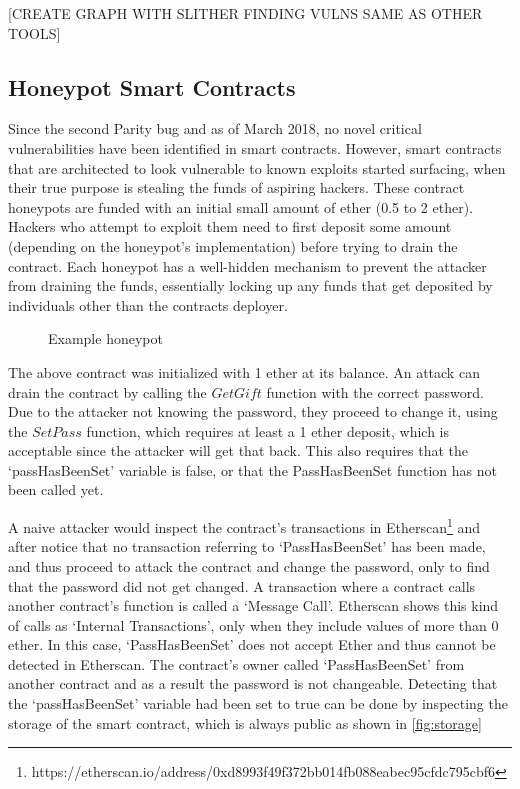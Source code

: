 [CREATE GRAPH WITH SLITHER FINDING VULNS SAME AS OTHER TOOLS]

\subsection{Honeypot Smart Contracts}
Since the second Parity bug and as of March 2018, no novel critical vulnerabilities have been identified in smart contracts. However, smart contracts that are architected to look vulnerable to known exploits started surfacing, when their true purpose is stealing the funds of aspiring hackers. These contract honeypots are funded with an initial small amount of ether (0.5 to 2 ether). Hackers who attempt to exploit them need to first deposit some amount (depending on the honeypot's implementation) before trying to drain the contract. Each honeypot has a well-hidden mechanism to prevent the attacker from draining the funds, essentially locking up any funds that get deposited by individuals other than the contracts deployer. 

\begin{figure}[H]
    \centering
    
    \caption{Example honeypot}
    \label{smart_contract}
\end{figure}

The above contract was initialized with 1 ether at its balance. An attack can drain the contract by calling the $GetGift$ function with the correct password. Due to the attacker not knowing the password, they proceed to change it, using the $SetPass$ function, which requires at least a 1 ether deposit, which is acceptable since the attacker will get that back. This also requires that the `passHasBeenSet' variable is false, or that the PassHasBeenSet function has not been called yet.

A naive attacker would inspect the contract's transactions in Etherscan\footnote{https://etherscan.io/address/0xd8993f49f372bb014fb088eabec95cfdc795cbf6} and after notice that no transaction referring to `PassHasBeenSet' has been made, and thus proceed to attack the contract and change the password, only to find that the password did not get changed. A transaction where a contract calls another contract's function is called a `Message Call'. Etherscan shows this kind of calls as `Internal Transactions', only when they include values of more than 0 ether. In this case, `PassHasBeenSet' does not accept Ether and thus cannot be detected in Etherscan. The contract's owner called `PassHasBeenSet' from another contract and as a result the password is not changeable. Detecting that the `passHasBeenSet' variable had been set to true can be done by inspecting the storage of the smart contract, which is always public as shown in \ref{fig:storage}

